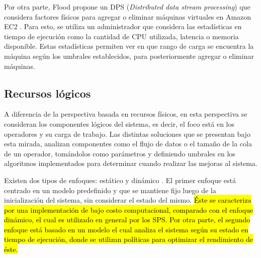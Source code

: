 Por otra parte, Flood \citep{Alves2010flood} propone un DPS (\textit{Distributed data stream processing}) que considera factores físicos para agregar o eliminar máquinas virtuales en Amazon EC2 \citep{amazonec2}. Para esto, se utiliza un administrador que considera las estadísticas en tiempo de ejecución como la cantidad de CPU utilizada, latencia o memoria disponible. Estas estadísticas permiten ver en que rango de carga se encuentra la máquina según los umbrales establecidos, para posteriormente agregar o eliminar máquinas.

\subsection{Recursos lógicos}
\label{subsec:recLogicosBC}

A diferencia de la perspectiva basada en recursos físicos, en esta perspectiva se consideran los componentes lógicos del sistema, es decir, el foco está en los operadores y su carga de trabajo. Las distintas soluciones que se presentan bajo esta mirada, analizan componentes como el flujo de datos o el tamaño de la cola de un operador, tomándolos como parámetros y definiendo umbrales en los algoritmos implementados para determinar cuando realizar las mejoras al sistema.


Existen dos tipos de enfoques: estático y dinámico \citep{Gupta99loadsharing}. El primer enfoque está centrado en un modelo predefinido y que se mantiene fijo luego de la inicialización del sistema, sin considerar el estado del mismo. \hl{Éste se caracteriza por una implementación de bajo costo computacional, comparado con el enfoque dinámico, el cual es utilizado en general por los SPS. Por otra parte, el segundo enfoque está basado en un modelo el cual analiza el sistema según su estado en tiempo de ejecución, donde se utilizan políticas para optimizar el rendimiento de éste.}


